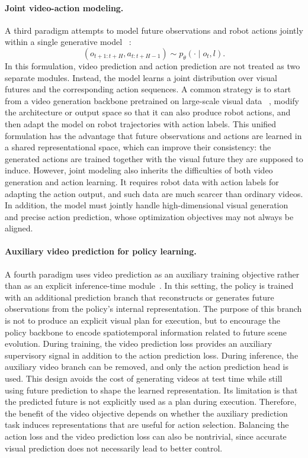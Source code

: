 \paragraph{Joint video-action modeling.}
A third paradigm attempts to model future observations and robot actions jointly within a single generative model ~\cite{ye2026dreamzero,kim2026cosmospolicy,cheang2024gr2,li2026lingbotva}:
\[
(o_{t+1:t+H}, a_{t:t+H-1})
\sim p_\theta(\cdot \mid o_t, l).
\]
In this formulation, video prediction and action prediction are not treated as two separate modules. Instead, the model learns a joint distribution over visual futures and the corresponding action sequences. A common strategy is to start from a video generation backbone pretrained on large-scale visual data ~\cite{cosmos,wan2025}, modify the architecture or output space so that it can also produce robot actions, and then adapt the model on robot trajectories with action labels. This unified formulation has the advantage that future observations and actions are learned in a shared representational space, which can improve their consistency: the generated actions are trained together with the visual future they are supposed to induce. However, joint modeling also inherits the difficulties of both video generation and action learning. It requires robot data with action labels for adapting the action output, and such data are much scarcer than ordinary videos. In addition, the model must jointly handle high-dimensional visual generation and precise action prediction, whose optimization objectives may not always be aligned. 

\paragraph{Auxiliary video prediction for policy learning.}
A fourth paradigm uses video prediction as an auxiliary training objective rather than as an explicit inference-time module~\cite{yuan2026fastwam,zhu2025uwm,li2025uva,bu2025univla,bi2026motus}. In this setting, the policy is trained with an additional prediction branch that reconstructs or generates future observations from the policy's internal representation. The purpose of this branch is not to produce an explicit visual plan for execution, but to encourage the policy backbone to encode spatiotemporal information related to future scene evolution. During training, the video prediction loss provides an auxiliary supervisory signal in addition to the action prediction loss. During inference, the auxiliary video branch can be removed, and only the action prediction head is used. This design avoids the cost of generating videos at test time while still using future prediction to shape the learned representation. Its limitation is that the predicted future is not explicitly used as a plan during execution. Therefore, the benefit of the video objective depends on whether the auxiliary prediction task induces representations that are useful for action selection. Balancing the action loss and the video prediction loss can also be nontrivial, since accurate visual prediction does not necessarily lead to better control.



